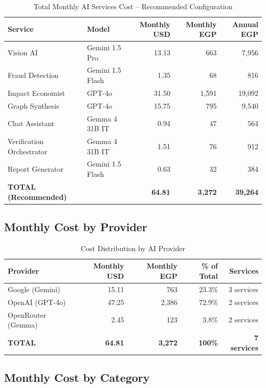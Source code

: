 \documentclass[11pt,a4paper]{article}
\begin{document}
\begin{table}[H]
\centering
\begin{tabular}{|l|l|r|r|r|}
\hline
\textbf{Service} & \textbf{Model} & \textbf{Monthly USD} & \textbf{Monthly EGP} & \textbf{Annual EGP} \\
\hline
Vision AI & Gemini 1.5 Pro & 13.13 & 663 & 7,956 \\
\hline
Fraud Detection & Gemini 1.5 Flash & 1.35 & 68 & 816 \\
\hline
Impact Economist & GPT-4o & 31.50 & 1,591 & 19,092 \\
\hline
Graph Synthesis & GPT-4o & 15.75 & 795 & 9,540 \\
\hline
Chat Assistant & Gemma 4 31B IT & 0.94 & 47 & 564 \\
\hline
Verification Orchestrator & Gemma 4 31B IT & 1.51 & 76 & 912 \\
\hline
Report Generator & Gemini 1.5 Flash & 0.63 & 32 & 384 \\
\hline
\textbf{TOTAL (Recommended)} & & \textbf{64.81} & \textbf{3,272} & \textbf{39,264} \\
\hline
\end{tabular}
\caption{Total Monthly AI Services Cost -- Recommended Configuration}
\end{table}

\subsection{Monthly Cost by Provider}

\begin{table}[H]
\centering
\begin{tabular}{|l|r|r|r|r|}
\hline
\textbf{Provider} & \textbf{Monthly USD} & \textbf{Monthly EGP} & \textbf{\% of Total} & \textbf{Services} \\
\hline
Google (Gemini) & 15.11 & 763 & 23.3\% & 3 services \\
\hline
OpenAI (GPT-4o) & 47.25 & 2,386 & 72.9\% & 2 services \\
\hline
OpenRouter (Gemma) & 2.45 & 123 & 3.8\% & 2 services \\
\hline
\textbf{TOTAL} & \textbf{64.81} & \textbf{3,272} & \textbf{100\%} & \textbf{7 services} \\
\hline
\end{tabular}
\caption{Cost Distribution by AI Provider}
\end{table}

\subsection{Monthly Cost by Category}
\end{document}

